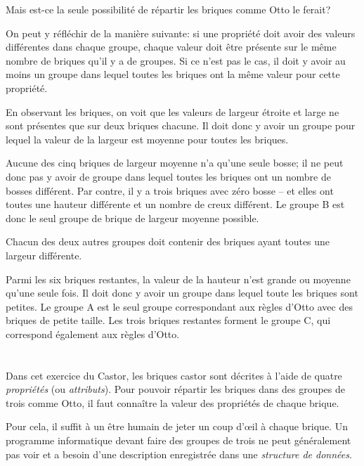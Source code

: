 {{{\par}

Mais est-ce la seule possibilité de répartir les briques comme Otto le ferait?

On peut y réfléchir de la manière suivante: si une propriété doit avoir des valeurs différentes dans chaque groupe, chaque valeur doit être présente sur le même nombre de briques qu’il y a de groupes. Si ce n’est pas le cas, il doit y avoir au moins un groupe dans lequel toutes les briques ont la même valeur pour cette propriété.

En observant les briques, on voit que les valeurs de largeur étroite et large ne sont présentes que sur deux briques chacune. Il doit donc y avoir un groupe pour lequel la valeur de la largeur est moyenne pour toutes les briques.

Aucune des cinq briques de largeur moyenne n’a qu’une seule bosse; il ne peut donc pas y avoir de groupe dans lequel toutes les briques ont un nombre de bosses différent. Par contre, il y a trois briques avec zéro bosse – et elles ont toutes une hauteur différente et un nombre de creux différent. Le groupe B est donc le seul groupe de brique de largeur moyenne possible.

Chacun des deux autres groupes doit contenir des briques ayant toutes une largeur différente.

Parmi les six briques restantes, la valeur de la hauteur n’est grande ou moyenne qu’une seule fois. Il doit donc y avoir un groupe dans lequel toute les briques sont petites. Le groupe A est le seul groupe correspondant aux règles d’Otto avec des briques de petite taille. Les trois briques restantes forment le groupe C, qui correspond également aux règles d’Otto.



\section*{\BrochureItsInformatics}
Dans cet exercice du Castor, les briques castor sont décrites à l’aide de quatre \emph{propriétés} (ou \emph{attributs}). Pour pouvoir répartir les briques dans des groupes de trois comme Otto, il faut connaître la valeur des propriétés de chaque brique.

Pour cela, il suffit à un être humain de jeter un coup d’œil à chaque brique. Un programme informatique devant faire des groupes de trois ne peut généralement pas voir et a besoin d’une description enregistrée dans une \emph{structure de données}.

}}

